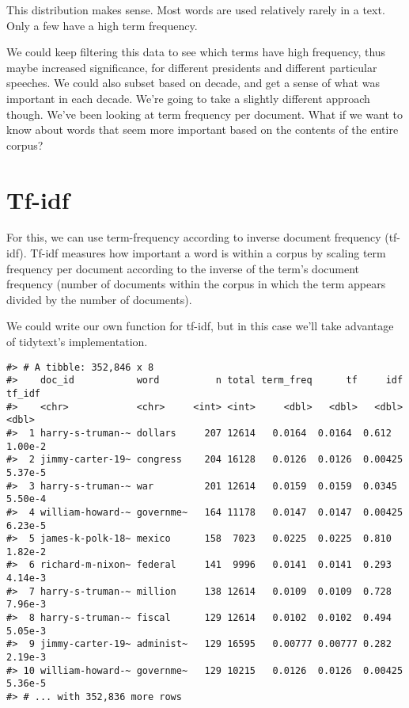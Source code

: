 \documentclass[]{book}
\newenvironment{Shaded}{\begin{snugshade}}{\end{snugshade}}
\newcommand{\KeywordTok}[1]{\textcolor[rgb]{0.13,0.29,0.53}{\textbf{#1}}}
\newcommand{\NormalTok}[1]{#1}
\newcommand{\OperatorTok}[1]{\textcolor[rgb]{0.81,0.36,0.00}{\textbf{#1}}}
\newcommand{\StringTok}[1]{\textcolor[rgb]{0.31,0.60,0.02}{#1}}
\begin{document}
This distribution makes sense. Most words are used relatively rarely in a text. Only a few have a high term frequency.

We could keep filtering this data to see which terms have high frequency, thus maybe increased significance, for different presidents and different particular speeches. We could also subset based on decade, and get a sense of what was important in each decade. We're going to take a slightly different approach though. We've been looking at term frequency per document. What if we want to know about words that seem more important based on the contents of the entire corpus?

\hypertarget{tf-idf}{%
\section{Tf-idf}\label{tf-idf}}

For this, we can use term-frequency according to inverse document frequency (tf-idf). Tf-idf measures how important a word is within a corpus by scaling term frequency per document according to the inverse of the term's document frequency (number of documents within the corpus in which the term appears divided by the number of documents).

We could write our own function for tf-idf, but in this case we'll take advantage of tidytext's implementation.

\begin{Shaded}
\end{Shaded}

\begin{verbatim}
#> # A tibble: 352,846 x 8
#>    doc_id           word          n total term_freq      tf     idf  tf_idf
#>    <chr>            <chr>     <int> <int>     <dbl>   <dbl>   <dbl>   <dbl>
#>  1 harry-s-truman-~ dollars     207 12614   0.0164  0.0164  0.612   1.00e-2
#>  2 jimmy-carter-19~ congress    204 16128   0.0126  0.0126  0.00425 5.37e-5
#>  3 harry-s-truman-~ war         201 12614   0.0159  0.0159  0.0345  5.50e-4
#>  4 william-howard-~ governme~   164 11178   0.0147  0.0147  0.00425 6.23e-5
#>  5 james-k-polk-18~ mexico      158  7023   0.0225  0.0225  0.810   1.82e-2
#>  6 richard-m-nixon~ federal     141  9996   0.0141  0.0141  0.293   4.14e-3
#>  7 harry-s-truman-~ million     138 12614   0.0109  0.0109  0.728   7.96e-3
#>  8 harry-s-truman-~ fiscal      129 12614   0.0102  0.0102  0.494   5.05e-3
#>  9 jimmy-carter-19~ administ~   129 16595   0.00777 0.00777 0.282   2.19e-3
#> 10 william-howard-~ governme~   129 10215   0.0126  0.0126  0.00425 5.36e-5
#> # ... with 352,836 more rows
\end{verbatim}
\end{document}
